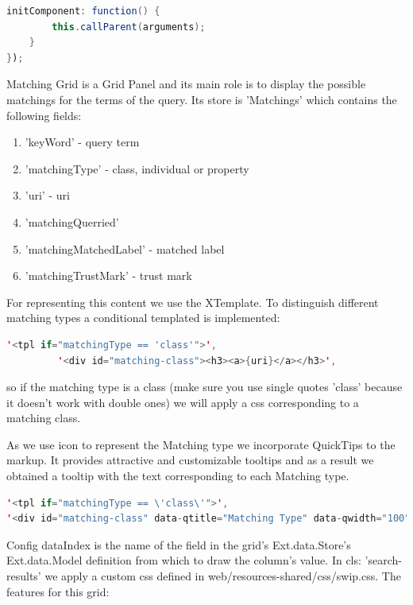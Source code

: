 \begin{lstlisting}[language=Java]
    initComponent: function() {
        this.callParent(arguments);
    }
});


\end{lstlisting}

\par Matching Grid is a Grid Panel and its main role is to display the possible matchings for the terms of the query. Its store is  'Matchings' which contains the following fields: 
   
   \begin{enumerate}
	   	\item 'keyWord' - query term
		\item 'matchingType' - class, individual or property
		\item 'uri' - uri
		\item 'matchingQuerried'
		\item 'matchingMatchedLabel' - matched label
		\item 'matchingTrustMark' - trust mark
   \end{enumerate}
\par For representing this content we use the XTemplate.  To distinguish different matching types a conditional templated is implemented: 
     \begin{lstlisting}[language=Java]
         '<tpl if="matchingType == 'class'">',
         '<div id="matching-class"><h3><a>{uri}</a></h3>',
     \end{lstlisting}    
so if the matching type is a class (make sure you use single quotes 'class' because it doesn’t work with double ones)  we will apply a css corresponding to a matching class.\\
\par As we use icon to represent the Matching type we incorporate QuickTips to the markup. It provides attractive and customizable tooltips and as a result we obtained a tooltip with the text corresponding to each Matching type. 
     \begin{lstlisting}[language=Java]
'<tpl if="matchingType == \'class\'">',
'<div id="matching-class" data-qtitle="Matching Type" data-qwidth="100" data-qtip="It is a class!"><h3><a>{uri}</a></h3>',
     \end{lstlisting}  
\par Config dataIndex is the name of the field in the grid's Ext.data.Store's Ext.data.Model definition from which to draw the column's value.
In cls: 'search-results' we apply a custom css defined in web/resources-shared/css/swip.css. 
The features for this grid:
